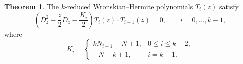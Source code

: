 \documentclass[preprint,3p,10pt]{elsarticle}
\theoremstyle{definition}
\newtheorem{theorem}{Theorem}[section]
\begin{document}
\begin{theorem}
\label{thm:k-reduced-WH-NY-bilinear}
The \(k\)-reduced Wronskian--Hermite polynomials \(T_i(z)\) satisfy
\begin{equation}
\label{eq:k-reduced-WH-NY-z-bilinear}
    \left(
        D_z^2-\frac{z}{2}D_z-\frac{K_i}{2}
    \right)
    T_i(z)\cdot T_{i+1}(z)=0,
    \qquad
    i=0,\ldots,k-1,
\end{equation}
where 
\begin{equation}
\label{eq:k-reduced-WH-Ki}
    K_i=
    \begin{cases}
        kN_{i+1}-N+1, & 0\le i\le k-2,\\
        -N-k+1, & i=k-1.
    \end{cases}
\end{equation}
\end{theorem}
\end{document}
